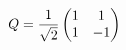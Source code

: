 \documentclass[preview]{standalone}
\begin{document}
\begin{align*}
\special{dvisvgm:raw <g id='unique000'>}Q=\dfrac{1}{\sqrt2}\begin{pmatrix}1&1\\1&-1\end{pmatrix}\special{dvisvgm:raw </g>}
\end{align*}
\end{document}

